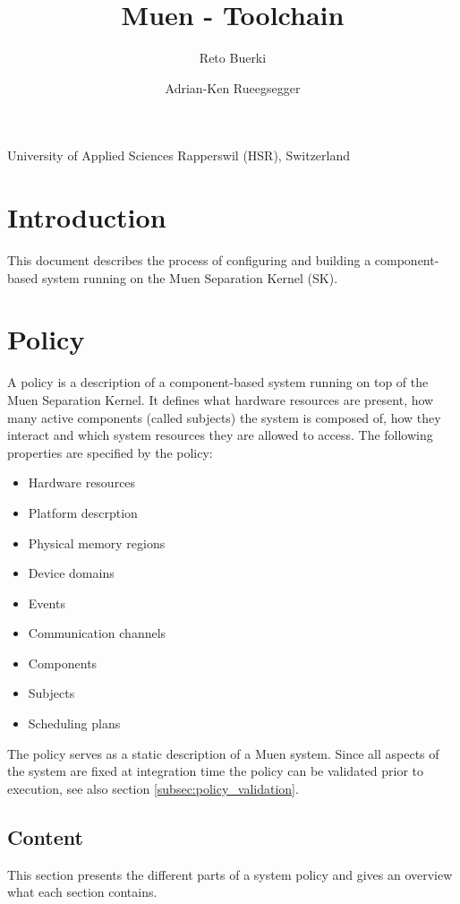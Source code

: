 \documentclass[a4paper,twoside,titlepage]{article}
\title{Muen - Toolchain}
\author{Reto Buerki \and Adrian-Ken Rueegsegger}
\begin{document}


\maketitle

\begin{center}
	University of Applied Sciences Rapperswil (HSR), Switzerland
\end{center}
\clearpage

\tableofcontents
\listoffigures
\lstlistoflistings

\section{Introduction}
This document describes the process of configuring and building a
component-based system running on the Muen Separation Kernel (SK).

\section{Policy}
A policy is a description of a component-based system running on top of the Muen
Separation Kernel. It defines what hardware resources are present, how many
active components (called subjects) the system is composed of, how they interact
and which system resources they are allowed to access. The following properties
are specified by the policy:

\begin{itemize}
	\item Hardware resources
	\item Platform descrption
	\item Physical memory regions
	\item Device domains
	\item Events
	\item Communication channels
	\item Components
	\item Subjects
	\item Scheduling plans
\end{itemize}

The policy serves as a static description of a Muen system. Since all aspects of
the system are fixed at integration time the policy can be validated prior to
execution, see also section \ref{subsec:policy_validation}.

\subsection{Content}
This section presents the different parts of a system policy and gives an
overview what each section contains.
\end{document}

